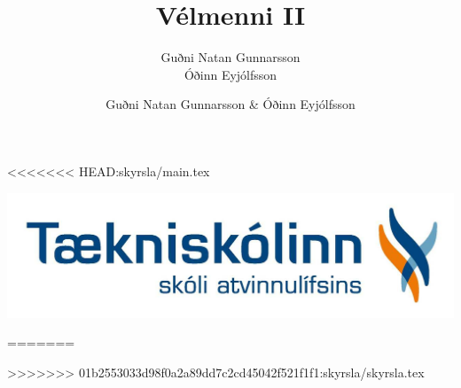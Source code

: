 \documentclass[a4pape]{article}
\begin{document}
\begin{titlepage}
\title{Vélmenni II}
<<<<<<< HEAD:skyrsla/main.tex
\author{Guðni Natan Gunnarsson \\ Óðinn Eyjólfsson}
\includegraphics[scale=.45]{img/logotskoli_2}
\end{titlepage}

=======
\author{Guðni Natan Gunnarsson \& Óðinn Eyjólfsson}
>>>>>>> 01b2553033d98f0a2a89dd7c2cd45042f521f1f1:skyrsla/skyrsla.tex
\maketitle
\tableofcontents

\newpage

\newpage

\newpage

\newpage

\newpage

\newpage

\newpage



\newpage

\end{document}
